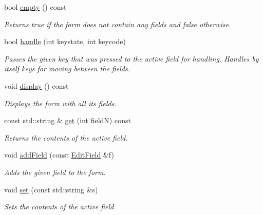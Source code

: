 \begin{DoxyCompactItemize}
\item 
bool \hyperlink{structslb_1_1core_1_1ui_1_1Form_a8620608c03f10da64add6ff57a264667}{empty} () const 
\begin{DoxyCompactList}\small\item\em Returns {\ttfamily true} if the form does not contain any fields and {\ttfamily false} otherwise. \end{DoxyCompactList}\item 
bool \hyperlink{structslb_1_1core_1_1ui_1_1Form_a96b694556d31b41fad4ed52b13fcddec}{handle} (int keystate, int keycode)
\begin{DoxyCompactList}\small\item\em Passes the given key that was pressed to the active field for handling. Handles by itself keys for moving between the fields. \end{DoxyCompactList}\item 
void \hyperlink{structslb_1_1core_1_1ui_1_1Form_a55bfdb477b8698608fbe320d820e7f3d}{display} () const \hypertarget{structslb_1_1core_1_1ui_1_1Form_a55bfdb477b8698608fbe320d820e7f3d}{}\label{structslb_1_1core_1_1ui_1_1Form_a55bfdb477b8698608fbe320d820e7f3d}

\begin{DoxyCompactList}\small\item\em Displays the form with all its fields. \end{DoxyCompactList}\item 
const std\+::string \& \hyperlink{structslb_1_1core_1_1ui_1_1Form_a2a0da97a1f8a4b19489022417f3b8dfa}{get} (int fieldN) const 
\begin{DoxyCompactList}\small\item\em Returns the contents of the active field. \end{DoxyCompactList}\item 
void \hyperlink{structslb_1_1core_1_1ui_1_1Form_a2d33c87a993c6bf4e2a95e6dcd0d1ac3}{add\+Field} (const \hyperlink{structslb_1_1core_1_1ui_1_1EditField}{Edit\+Field} \&f)
\begin{DoxyCompactList}\small\item\em Adds the given field to the form. \end{DoxyCompactList}\item 
void \hyperlink{structslb_1_1core_1_1ui_1_1Form_a503e6e9b06c01543741f05ba11056253}{set} (const std\+::string \&s)
\begin{DoxyCompactList}\small\item\em Sets the contents of the active field. \end{DoxyCompactList}\end{DoxyCompactItemize}
